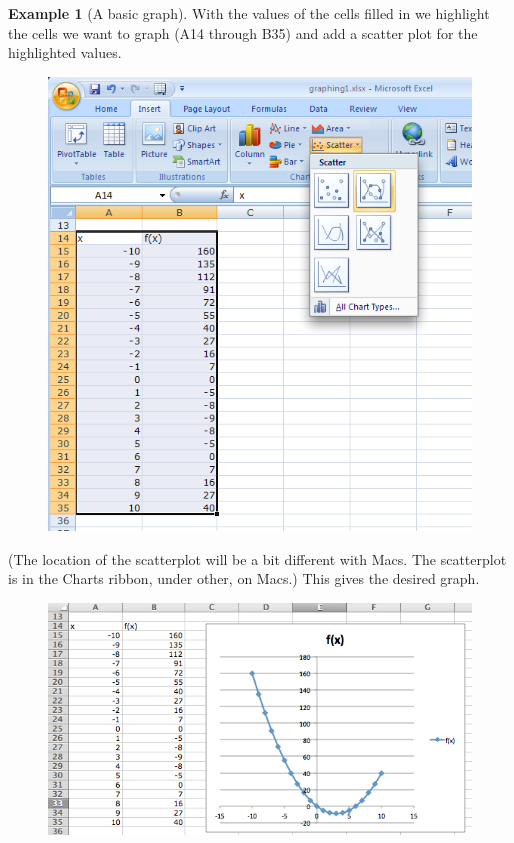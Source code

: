 \documentclass[10pt,]{book}
\theoremstyle{plain}
\theoremstyle{definition}
\newtheorem{example}[theorem]{Example}
\theoremstyle{definition}
\begin{document}
\begin{example}[A basic graph]
With the values of the cells filled in we highlight the cells we want to graph (A14 through B35) and add a scatter plot for the highlighted values.
%
\leavevmode%
\begin{figure}
\centering
\includegraphics[width=0.8\linewidth]{images/sec1-4-3.png}
\end{figure}
\par

(The location of the scatterplot will be a bit different with Macs.  The scatterplot is in the Charts ribbon, under other, on Macs.)  This gives the desired graph.%
\leavevmode%
\begin{figure}
\centering
\includegraphics[width=0.8\linewidth]{images/sec1-4-4.png}
\end{figure}
\end{example}
\end{document}
